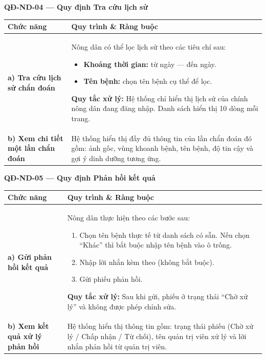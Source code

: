 \documentclass[12pt,a4paper]{article}
\begin{document}
\vspace{0.3cm}
\noindent\textbf{QĐ-ND-04 --- Quy định Tra cứu lịch sử}
 
\begin{longtable}{|
    >{\raggedright\arraybackslash}p{2.8cm}|
    >{\raggedright\arraybackslash}p{12cm}|}
\hline
\rowcolor{headerblue}
\textbf{Chức năng} & \textbf{Quy trình \& Ràng buộc} \\
\hline
\endhead
\textbf{a) Tra cứu lịch sử chẩn đoán} &
Nông dân có thể lọc lịch sử theo các tiêu chí sau:
\begin{itemize}[leftmargin=*,topsep=2pt,itemsep=1pt]
    \item \textbf{Khoảng thời gian:} từ ngày --- đến ngày.
    \item \textbf{Tên bệnh:} chọn tên bệnh cụ thể để lọc.
\end{itemize}
\textbf{Quy tắc xử lý:} Hệ thống chỉ hiển thị lịch sử của chính nông dân đang đăng nhập. Danh sách hiển thị 10 dòng mỗi trang. \\
\hline
\textbf{b) Xem chi tiết một lần chẩn đoán} &
Hệ thống hiển thị đầy đủ thông tin của lần chẩn đoán đó gồm: ảnh gốc, vùng khoanh bệnh, tên bệnh, độ tin cậy và gợi ý dinh dưỡng tương ứng. \\
\hline
\end{longtable}
 
\vspace{0.3cm}
\noindent\textbf{QĐ-ND-05 --- Quy định Phản hồi kết quả}
 
\begin{longtable}{|
    >{\raggedright\arraybackslash}p{2.8cm}|
    >{\raggedright\arraybackslash}p{12cm}|}
\hline
\rowcolor{headerblue}
\textbf{Chức năng} & \textbf{Quy trình \& Ràng buộc} \\
\hline
\endhead
\textbf{a) Gửi phản hồi kết quả} &
Nông dân thực hiện theo các bước sau:
\begin{enumerate}[leftmargin=*,topsep=2pt,itemsep=1pt]
    \item Chọn tên bệnh thực tế từ danh sách có sẵn. Nếu chọn ``Khác'' thì bắt buộc nhập tên bệnh vào ô trống.
    \item Nhập lời nhắn kèm theo (không bắt buộc).
    \item Gửi phiếu phản hồi.
\end{enumerate}
\textbf{Quy tắc xử lý:} Sau khi gửi, phiếu ở trạng thái ``Chờ xử lý'' và không được phép chỉnh sửa. \\
\hline
\textbf{b) Xem kết quả xử lý phản hồi} &
Hệ thống hiển thị thông tin gồm: trạng thái phiếu (Chờ xử lý / Chấp nhận / Từ chối), tên quản trị viên xử lý và lời nhắn phản hồi từ quản trị viên. \\
\hline
\end{longtable}
\end{document}
